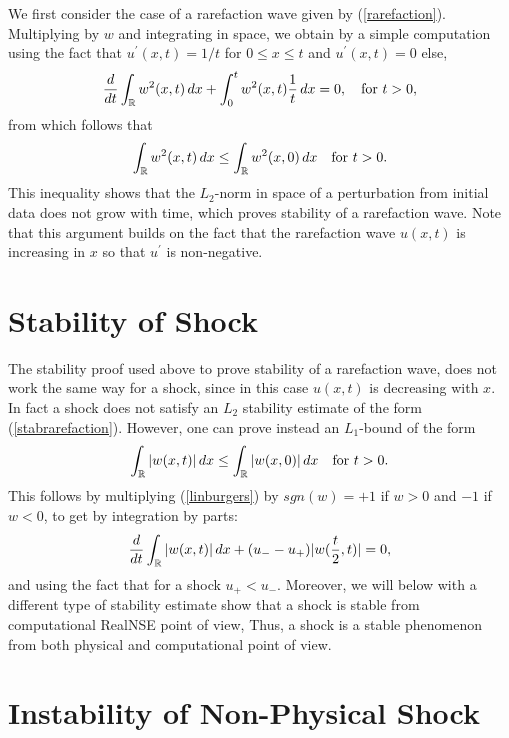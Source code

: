 We first consider the case of
a rarefaction wave given by (\ref{rarefaction}). Multiplying by $w$ and
integrating in space, we obtain by a simple computation using the fact
that $u^\prime (x,t)=1/t$ for $0\le x\le t$ and $u^\prime (x,t)=0$ else,
\[
\frac{d}{dt}\int_{\mathbb{R}} w^2(x,t)\, dx+
\int_0^t w^2(x,t)\frac{1}{t}\, dx =0,\quad\mbox{for }t>0,
\]
from which follows that
\begin{equation}\label{stabrarefaction}
\int_{\mathbb{R}} w^2(x,t)\, dx\le \int_{\mathbb{R}} w^2(x,0)\, dx\quad\mbox{for }t>0.
\end{equation}
This inequality shows that the $L_2$-norm in space
of a perturbation from initial data does not grow with time, 
which proves stability 
of a rarefaction wave. Note that this
argument builds on the fact that the rarefaction wave $u(x,t)$ is increasing in $x$ so that $u^\prime$ is
non-negative.

\section{Stability of Shock}

The stability proof used above to prove stability of a rarefaction
wave, does not work the same way for a shock, since in this case
$u(x,t)$ is decreasing with $x$. In fact a shock does not satisfy an
$L_2$ stability estimate of the form (\ref{stabrarefaction}). However,
one can prove instead an $L_1$-bound of the form
\begin{equation}\label{stabshock}
\int_{\mathbb{R}} \vert w(x,t)\vert\, dx\le \int_{\mathbb{R}} \vert w(x,0)\vert
\, dx\quad\mbox{for }t>0.
\end{equation}
This follows by multiplying (\ref{linburgers}) by $sgn (w)=+1$ if $w>0$ 
and $-1$ if $w<0$, to get by integration by parts:
\begin{equation}\label{linburgersL1}
\frac{d}{dt}
\int_{\mathbb{R}}\vert w(x,t)\vert\, dx +(u_--u_+)\vert w(\frac{t}{2},t)\vert =0,
\end{equation}
and using the fact that for a shock $u_+<u_-$.
Moreover, we will below with a different type of stability estimate
show that a shock is stable from computational RealNSE point of view, 
Thus, a shock is a stable phenomenon from both physical and computational
point of view.


\section{Instability of Non-Physical Shock}

